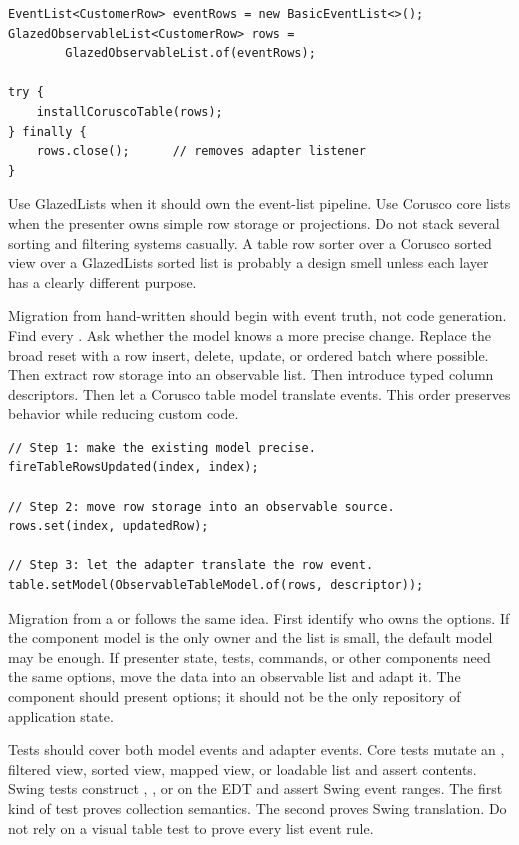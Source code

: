 \begin{lstlisting}[caption={Adapt GlazedLists deliberately at the boundary.}]
EventList<CustomerRow> eventRows = new BasicEventList<>();
GlazedObservableList<CustomerRow> rows =
        GlazedObservableList.of(eventRows);

try {
    installCoruscoTable(rows);
} finally {
    rows.close();      // removes adapter listener
}
\end{lstlisting}

Use GlazedLists when it should own the event-list pipeline. Use Corusco core
lists when the presenter owns simple row storage or projections. Do not stack
several sorting and filtering systems casually. A table row sorter over a
Corusco sorted view over a GlazedLists sorted list is probably a design smell
unless each layer has a clearly different purpose.

Migration from hand-written  should begin with event
truth, not code generation. Find every . Ask whether
the model knows a more precise change. Replace the broad reset with a row insert,
delete, update, or ordered batch where possible. Then extract row storage into an
observable list. Then introduce typed column descriptors. Then let a Corusco
table model translate events. This order preserves behavior while reducing
custom code.

\begin{lstlisting}[caption={A staged migration from a custom table model.}]
// Step 1: make the existing model precise.
fireTableRowsUpdated(index, index);

// Step 2: move row storage into an observable source.
rows.set(index, updatedRow);

// Step 3: let the adapter translate the row event.
table.setModel(ObservableTableModel.of(rows, descriptor));
\end{lstlisting}

Migration from a  or  follows the
same idea. First identify who owns the options. If the component model is the
only owner and the list is small, the default model may be enough. If presenter
state, tests, commands, or other components need the same options, move the data
into an observable list and adapt it. The component should present options; it
should not be the only repository of application state.

Tests should cover both model events and adapter events. Core tests mutate an
, filtered view, sorted view, mapped view, or loadable
list and assert  contents. Swing tests construct
, , or
 on the EDT and assert Swing event ranges. The first
kind of test proves collection semantics. The second proves Swing translation.
Do not rely on a visual table test to prove every list event rule.

